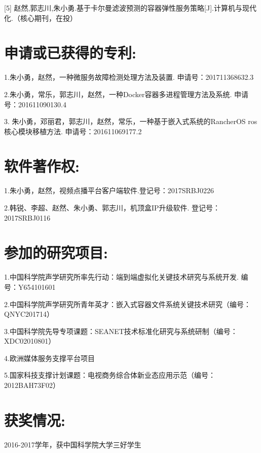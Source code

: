 [5] 赵然,郭志川,朱小勇.基于卡尔曼滤波预测的容器弹性服务策略[J].计算机与现代化.（核心期刊，在投）

\section*{申请或已获得的专利:}

1.朱小勇，赵然，一种微服务故障检测处理方法及装置. 申请号：201711368632.3

2.朱小勇，常乐，郭志川，赵然，一种Docker容器多进程管理方法及系统. 申请号：201611090130.4

3. 朱小勇，邓丽君，郭志川，赵然，常乐，一种基于嵌入式系统的RancherOS ros核心模块移植方法. 申请号：201611069177.2

\section*{软件著作权:}

1.朱小勇，赵然，视频点播平台客户端软件.登记号：2017SRBJ0226

2.韩锐、李超、赵然、朱小勇、郭志川，机顶盒IP升级软件. 登记号：2017SRBJ0116

\section*{参加的研究项目:}

1.中国科学院声学研究所率先行动：端到端虚拟化关键技术研究与系统开发. 编号：Y654101601

2.中国科学院声学研究所青年英才：嵌入式容器文件系统关键技术研究（编号：QNYC201714）

3.中国科学院先导专项课题：SEANET技术标准化研究与系统研制（编号：XDC02010801）

4.欧洲媒体服务支撑平台项目

5.国家科技支撑计划课题：电视商务综合体新业态应用示范（编号：2012BAH73F02）

\section*{获奖情况:}
2016-2017学年，获中国科学院大学三好学生

\cleardoublepage[plain]%

